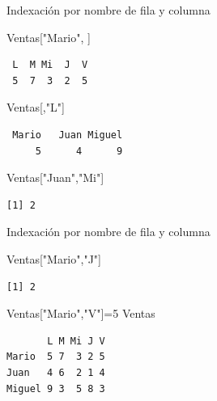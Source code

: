 \documentclass[
  ignorenonframetext,
  aspectratio=169,
  spanish,
]{beamer}
\newenvironment{Shaded}{\begin{snugshade}}{\end{snugshade}}
\newcommand{\DecValTok}[1]{\textcolor[rgb]{0.68,0.00,0.00}{#1}}
\newcommand{\NormalTok}[1]{\textcolor[rgb]{0.00,0.23,0.31}{#1}}
\newcommand{\OtherTok}[1]{\textcolor[rgb]{0.00,0.23,0.31}{#1}}
\newcommand{\StringTok}[1]{\textcolor[rgb]{0.13,0.47,0.30}{#1}}
\begin{document}
\begin{frame}[fragile]{Indexación por nombre de fila y columna}
\label{indexaciuxf3n-por-nombre-de-fila-y-columna}
\begin{Shaded}
\begin{Highlighting}[]
\NormalTok{Ventas[}\StringTok{"Mario"}\NormalTok{, ]}
\end{Highlighting}
\end{Shaded}

\begin{verbatim}
 L  M Mi  J  V 
 5  7  3  2  5 
\end{verbatim}

\begin{Shaded}
\begin{Highlighting}[]
\NormalTok{Ventas[,}\StringTok{"L"}\NormalTok{]}
\end{Highlighting}
\end{Shaded}

\begin{verbatim}
 Mario   Juan Miguel 
     5      4      9 
\end{verbatim}

\begin{Shaded}
\begin{Highlighting}[]
\NormalTok{Ventas[}\StringTok{"Juan"}\NormalTok{,}\StringTok{"Mi"}\NormalTok{]}
\end{Highlighting}
\end{Shaded}

\begin{verbatim}
[1] 2
\end{verbatim}
\end{frame}

\begin{frame}[fragile]{Indexación por nombre de fila y columna}
\label{indexaciuxf3n-por-nombre-de-fila-y-columna-1}
\begin{Shaded}
\begin{Highlighting}[]
\NormalTok{Ventas[}\StringTok{"Mario"}\NormalTok{,}\StringTok{"J"}\NormalTok{] }
\end{Highlighting}
\end{Shaded}

\begin{verbatim}
[1] 2
\end{verbatim}

\begin{Shaded}
\begin{Highlighting}[]
\NormalTok{Ventas[}\StringTok{"Mario"}\NormalTok{,}\StringTok{"V"}\NormalTok{]}\OtherTok{=}\DecValTok{5} 
\NormalTok{Ventas}
\end{Highlighting}
\end{Shaded}

\begin{verbatim}
       L M Mi J V
Mario  5 7  3 2 5
Juan   4 6  2 1 4
Miguel 9 3  5 8 3
\end{verbatim}
\end{frame}
\end{document}
